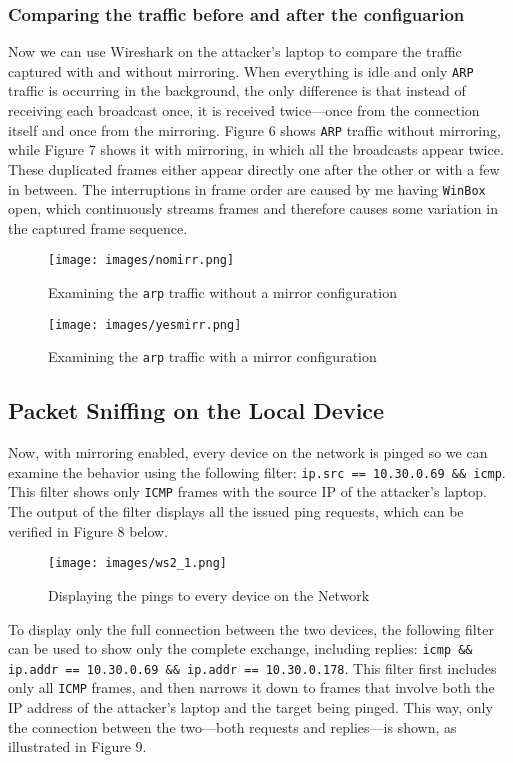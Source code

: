 \documentclass[a4paper]{article}
\newcommand{\abc}{\hfill \break}
\begin{document}
\subsubsection{Comparing the traffic before and after the configuarion}
Now we can use Wireshark on the attacker's laptop to compare the traffic captured with and without mirroring.\abc
When everything is idle and only \texttt{ARP} traffic is occurring in the background, the only difference is that instead of receiving each broadcast once, it is received twice—once from the connection itself and once from the mirroring.\abc
Figure 6 shows \texttt{ARP} traffic without mirroring, while Figure 7 shows it with mirroring, in which all the broadcasts appear twice. These duplicated frames either appear directly one after the other or with a few in between. The interruptions in frame order are caused by me having \texttt{WinBox} open, which continuously streams frames and therefore causes some variation in the captured frame sequence.
\begin{figure}[!htbp]
	\texttt{[image: images/nomirr.png]}
	\centering
	\caption{Examining the \texttt{arp} traffic without a mirror configuration}
\end{figure} \abc
\begin{figure}[!htbp]
	\texttt{[image: images/yesmirr.png]}
	\centering
	\caption{Examining the \texttt{arp} traffic with a mirror configuration}
\end{figure} \abc



\subsection{Packet Sniffing on the Local Device}
Now, with mirroring enabled, every device on the network is pinged so we can examine the behavior using the following filter: \texttt{ip.src == 10.30.0.69 \&\& icmp}. This filter shows only \texttt{ICMP} frames with the source IP of the attacker's laptop.\abc
The output of the filter displays all the issued ping requests, which can be verified in Figure 8 below.
\begin{figure}[!htbp]
	\texttt{[image: images/ws2\_1.png]}
	\centering
	\caption{Displaying the pings to every device on the Network}
\end{figure} \abc
To display only the full connection between the two devices, the following filter can be used to show only the complete exchange, including replies: \texttt{icmp \&\& ip.addr == 10.30.0.69 \&\& ip.addr == 10.30.0.178}.\abc
This filter first includes only all \texttt{ICMP} frames, and then narrows it down to frames that involve both the IP address of the attacker's laptop and the target being pinged. This way, only the connection between the two—both requests and replies—is shown, as illustrated in Figure 9.
\end{document}
